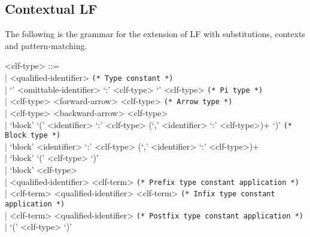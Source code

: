 \documentclass[11pt]{article}
\newcommand{\LF}{\textsc{LF}\xspace}
\begin{document}
\subsection{Contextual LF}\label{section:syntax-contextual-lf}

The following is the grammar for the extension of \LF with substitutions, contexts and pattern-matching.

\begin{grammar}
<clf-type> ::= \hfill\\
| <qualified-identifier> \hfill \texttt{(* Type constant *)}\\
| `{' <omittable-identifier> `:' <clf-type> `}' <clf-type> \hfill \texttt{(* Pi type *)}\\
| <clf-type> <forward-arrow> <clf-type> \hfill \texttt{(* Arrow type *)}\\
| <clf-type> <backward-arrow> <clf-type>\\
| `block' `(' <identifier> `:' <clf-type> (`,' <identifier> `:' <clf-type>)+ `)' \hfill \texttt{(* Block type *)}\\
| `block' <identifier> `:' <clf-type> (`,' <identifier> `:' <clf-type>)+\\
| `block' `(' <clf-type> `)'\\
| `block' <clf-type>\\
| <qualified-identifier> <clf-term> \hfill \texttt{(* Prefix type constant application *)}\\
| <clf-term> <qualified-identifier> <clf-term> \hfill \texttt{(* Infix type constant application *)}\\
| <clf-term> <qualified-identifier> \hfill \texttt{(* Postfix type constant application *)}\\
| `(' <clf-type> `)'


\end{grammar}
\end{document}
